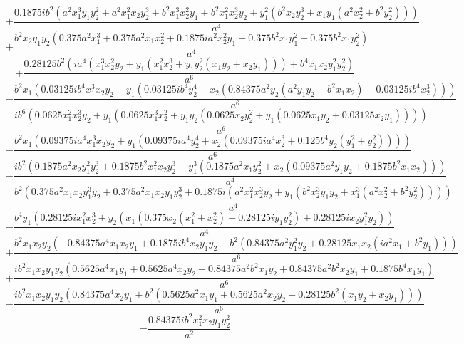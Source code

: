 $$+\frac{0.1875 i b^{2} \left(a^{2} x_{1}^{3} y_{1} y_{2}^{2} + a^{2} x_{1}^{2} x_{2} y_{2}^{3} + b^{2} x_{1}^{3} x_{2}^{2} y_{1} + b^{2} x_{1}^{2} x_{2}^{3} y_{2} + y_{1}^{2} \left(b^{2} x_{2} y_{2}^{3} + x_{1} y_{1} \left(a^{2} x_{2}^{2} + b^{2} y_{2}^{2}\right)\right)\right)}{a^{4}}$$
$$+\frac{b^{2} x_{2} y_{1} y_{2} \left(0.375 a^{2} x_{1}^{3} + 0.375 a^{2} x_{1} x_{2}^{2} + 0.1875 i a^{2} x_{2}^{2} y_{1} + 0.375 b^{2} x_{1} y_{1}^{2} + 0.375 b^{2} x_{1} y_{2}^{2}\right)}{a^{4}}$$
$$+\frac{0.28125 b^{2} \left(i a^{4} \left(x_{1}^{3} x_{2}^{2} y_{2} + y_{1} \left(x_{1}^{2} x_{2}^{3} + y_{1} y_{2}^{2} \left(x_{1} y_{2} + x_{2} y_{1}\right)\right)\right) + b^{4} x_{1} x_{2} y_{1}^{2} y_{2}^{2}\right)}{a^{6}}$$
$$- \frac{b^{2} x_{1} \left(0.03125 i b^{4} x_{1}^{3} x_{2} y_{2} + y_{1} \left(0.03125 i b^{4} y_{2}^{4} - x_{2} \left(0.84375 a^{2} y_{2} \left(a^{2} y_{1} y_{2} + b^{2} x_{1} x_{2}\right) - 0.03125 i b^{4} x_{2}^{3}\right)\right)\right)}{a^{6}}$$
$$- \frac{i b^{6} \left(0.0625 x_{1}^{2} x_{2}^{3} y_{2} + y_{1} \left(0.0625 x_{1}^{3} x_{2}^{2} + y_{1} y_{2} \left(0.0625 x_{2} y_{2}^{2} + y_{1} \left(0.0625 x_{1} y_{2} + 0.03125 x_{2} y_{1}\right)\right)\right)\right)}{a^{6}}$$
$$- \frac{b^{2} x_{1} \left(0.09375 i a^{4} x_{1}^{3} x_{2} y_{2} + y_{1} \left(0.09375 i a^{4} y_{2}^{4} + x_{2} \left(0.09375 i a^{4} x_{2}^{3} + 0.125 b^{4} y_{2} \left(y_{1}^{2} + y_{2}^{2}\right)\right)\right)\right)}{a^{6}}$$
$$- \frac{i b^{2} \left(0.1875 a^{2} x_{2} y_{1}^{2} y_{2}^{3} + 0.1875 b^{2} x_{1}^{2} x_{2} y_{2}^{3} + y_{1}^{3} \left(0.1875 a^{2} x_{1} y_{2}^{2} + x_{2} \left(0.09375 a^{2} y_{1} y_{2} + 0.1875 b^{2} x_{1} x_{2}\right)\right)\right)}{a^{4}}$$
$$- \frac{b^{2} \left(0.375 a^{2} x_{1} x_{2} y_{1}^{3} y_{2} + 0.375 a^{2} x_{1} x_{2} y_{1} y_{2}^{3} + 0.1875 i \left(a^{2} x_{1}^{2} x_{2}^{3} y_{2} + y_{1} \left(b^{2} x_{2}^{3} y_{1} y_{2} + x_{1}^{3} \left(a^{2} x_{2}^{2} + b^{2} y_{2}^{2}\right)\right)\right)\right)}{a^{4}}$$
$$- \frac{b^{4} y_{1} \left(0.28125 i x_{1}^{2} x_{2}^{3} + y_{2} \left(x_{1} \left(0.375 x_{2} \left(x_{1}^{2} + x_{2}^{2}\right) + 0.28125 i y_{1} y_{2}^{2}\right) + 0.28125 i x_{2} y_{1}^{2} y_{2}\right)\right)}{a^{4}}$$
$$+\frac{b^{2} x_{1} x_{2} y_{2} \left(- 0.84375 a^{4} x_{1} x_{2} y_{1} + 0.1875 i b^{4} x_{2} y_{1} y_{2} - b^{2} \left(0.84375 a^{2} y_{1}^{2} y_{2} + 0.28125 x_{1} x_{2} \left(i a^{2} x_{1} + b^{2} y_{1}\right)\right)\right)}{a^{6}}$$
$$+\frac{i b^{2} x_{1} x_{2} y_{1} y_{2} \left(0.5625 a^{4} x_{1} y_{1} + 0.5625 a^{4} x_{2} y_{2} + 0.84375 a^{2} b^{2} x_{1} y_{2} + 0.84375 a^{2} b^{2} x_{2} y_{1} + 0.1875 b^{4} x_{1} y_{1}\right)}{a^{6}}$$
$$- \frac{i b^{2} x_{1} x_{2} y_{1} y_{2} \left(0.84375 a^{4} x_{2} y_{1} + b^{2} \left(0.5625 a^{2} x_{1} y_{1} + 0.5625 a^{2} x_{2} y_{2} + 0.28125 b^{2} \left(x_{1} y_{2} + x_{2} y_{1}\right)\right)\right)}{a^{6}}$$
$$- \frac{0.84375 i b^{2} x_{1}^{2} x_{2} y_{1} y_{2}^{2}}{a^{2}}$$

